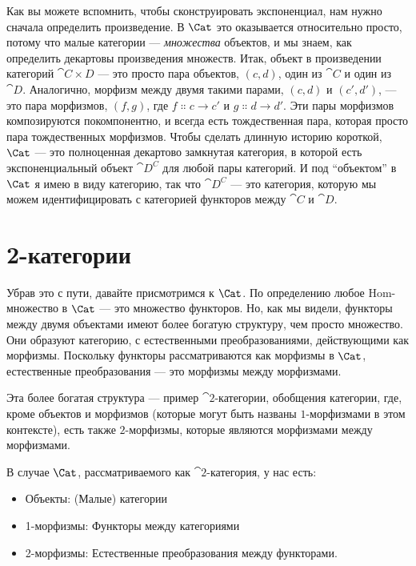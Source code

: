 Как вы можете вспомнить, чтобы сконструировать экспоненциал, нам нужно
сначала определить произведение. В $\Cat$ это оказывается относительно
просто, потому что малые категории --- \emph{множества} объектов, и мы знаем,
как определить декартовы произведения множеств. Итак, объект в произведении
категорий $\cat{C\times D}$ --- это просто пара объектов, $(c, d)$, один из $\cat{C}$
и один из $\cat{D}$. Аналогично, морфизм между двумя такими парами,
$(c, d)$ и $(c', d')$, --- это пара морфизмов, $(f, g)$, где
$f \Colon c \to c'$ и $g \Colon d \to d'$. Эти пары морфизмов
композируются покомпонентно, и всегда есть тождественная пара, которая
просто пара тождественных морфизмов. Чтобы сделать длинную историю короткой,
$\Cat$ --- это полноценная декартово замкнутая категория, в которой есть
экспоненциальный объект $\cat{D^C}$ для любой пары категорий.
И под ``объектом'' в $\Cat$ я имею в виду категорию, так что
$\cat{D^C}$ --- это категория, которую мы можем идентифицировать с
категорией функторов между $\cat{C}$ и $\cat{D}$.

\section{2-категории}

Убрав это с пути, давайте присмотримся к $\Cat$. По
определению любое Hom-множество в $\Cat$ --- это множество функторов. Но, как мы
видели, функторы между двумя объектами имеют более богатую структуру, чем
просто множество. Они образуют категорию, с естественными преобразованиями, действующими как
морфизмы. Поскольку функторы рассматриваются как морфизмы в $\Cat$,
естественные преобразования --- это морфизмы между морфизмами.

Эта более богатая структура --- пример $\cat{2}$-категории, обобщения
категории, где, кроме объектов и морфизмов (которые могут быть названы
$1$-морфизмами в этом контексте), есть также $2$-морфизмы, которые являются
морфизмами между морфизмами.

В случае $\Cat$, рассматриваемого как $\cat{2}$-категория, у нас есть:

\begin{itemize}
  \tightlist
  \item
        Объекты: (Малые) категории
  \item
        1-морфизмы: Функторы между категориями
  \item
        2-морфизмы: Естественные преобразования между функторами.
\end{itemize}

